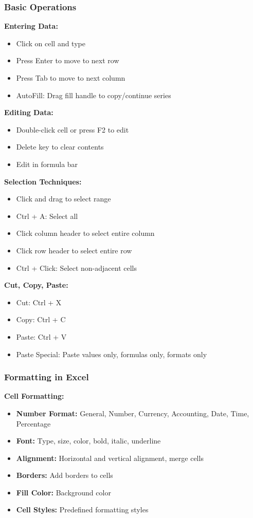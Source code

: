 \documentclass[12pt,a4paper]{article}
\begin{document}
\subsubsection{Basic Operations}

\textbf{Entering Data:}
\begin{itemize}
    \item Click on cell and type
    \item Press Enter to move to next row
    \item Press Tab to move to next column
    \item AutoFill: Drag fill handle to copy/continue series
\end{itemize}

\textbf{Editing Data:}
\begin{itemize}
    \item Double-click cell or press F2 to edit
    \item Delete key to clear contents
    \item Edit in formula bar
\end{itemize}

\textbf{Selection Techniques:}
\begin{itemize}
    \item Click and drag to select range
    \item Ctrl + A: Select all
    \item Click column header to select entire column
    \item Click row header to select entire row
    \item Ctrl + Click: Select non-adjacent cells
\end{itemize}

\textbf{Cut, Copy, Paste:}
\begin{itemize}
    \item Cut: Ctrl + X
    \item Copy: Ctrl + C
    \item Paste: Ctrl + V
    \item Paste Special: Paste values only, formulas only, formats only
\end{itemize}

\subsubsection{Formatting in Excel}

\textbf{Cell Formatting:}
\begin{itemize}
    \item \textbf{Number Format:} General, Number, Currency, Accounting, Date, Time, Percentage
    \item \textbf{Font:} Type, size, color, bold, italic, underline
    \item \textbf{Alignment:} Horizontal and vertical alignment, merge cells
    \item \textbf{Borders:} Add borders to cells
    \item \textbf{Fill Color:} Background color
    \item \textbf{Cell Styles:} Predefined formatting styles
\end{itemize}
\end{document}
